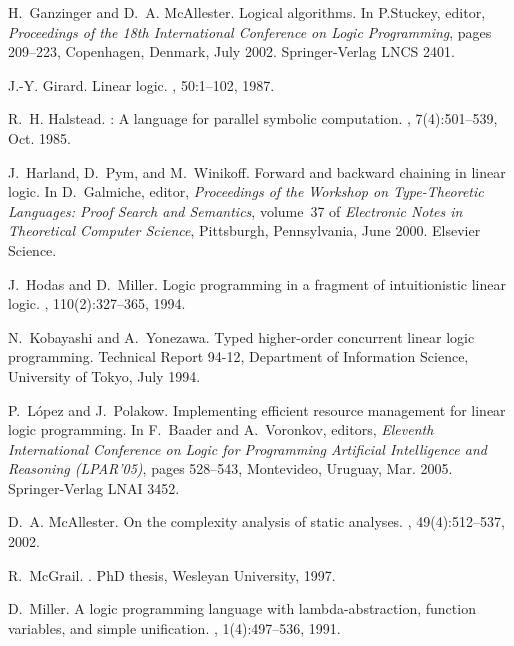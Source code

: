 \documentclass{sig-alt}
\begin{document}
\begin{thebibliography}{50}
H.~Ganzinger and D.~A. McAllester.
\newblock Logical algorithms.
\newblock In P.Stuckey, editor, {\em Proceedings of the 18th International
  Conference on Logic Programming}, pages 209--223, Copenhagen, Denmark, July
  2002. Springer-Verlag LNCS 2401.

J.-Y. Girard.
\newblock Linear logic.
, 50:1--102, 1987.

R.~H. Halstead.
: A language for parallel symbolic computation.
,
  7(4):501--539, Oct. 1985.

J.~Harland, D.~Pym, and M.~Winikoff.
\newblock Forward and backward chaining in linear logic.
\newblock In D.~Galmiche, editor, {\em Proceedings of the Workshop on
  Type-Theoretic Languages: Proof Search and Semantics}, volume~37 of {\em
  Electronic Notes in Theoretical Computer Science}, Pittsburgh, Pennsylvania,
  June 2000. Elsevier Science.

J.~Hodas and D.~Miller.
\newblock Logic programming in a fragment of intuitionistic linear logic.
, 110(2):327--365, 1994.

N.~Kobayashi and A.~Yonezawa.
\newblock Typed higher-order concurrent linear logic programming.
\newblock Technical Report 94-12, Department of Information Science, University
  of Tokyo, July 1994.

P.~L\'{o}pez and J.~Polakow.
\newblock Implementing efficient resource management for linear logic
  programming.
\newblock In F.~Baader and A.~Voronkov, editors, {\em Eleventh International
  Conference on Logic for Programming Artificial Intelligence and Reasoning
  (LPAR'05)}, pages 528--543, Montevideo, Uruguay, Mar. 2005. Springer-Verlag
  LNAI 3452.

D.~A. McAllester.
\newblock On the complexity analysis of static analyses.
, 49(4):512--537, 2002.

R.~McGrail.
.
\newblock PhD thesis, Wesleyan University, 1997.

D.~Miller.
\newblock A logic programming language with lambda-abstraction, function
  variables, and simple unification.
, 1(4):497--536, 1991.


\end{thebibliography}
\end{document}
